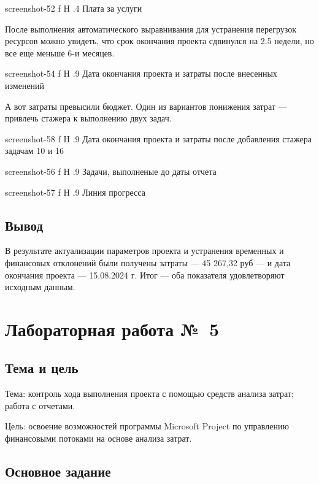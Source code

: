 \documentclass{bmstu}
\begin{document}
    {screenshot-52}
    {f}
    {H}
    {.4\textwidth}
    {Плата за услуги}
    
После выполнения автоматического выравнивания для устранения перегрузок ресурсов можно увидеть, что срок окончания проекта сдвинулся на 2.5 недели, но все еще меньше 6-и месяцев. 
    
    {screenshot-54}
    {f}
    {H}
    {.9\textwidth}
    {Дата окончания проекта и затраты после внесенных изменений}
    
А вот затраты превысили бюджет. 
Один из вариантов понижения затрат --- привлечь стажера к выполнению двух задач.

    {screenshot-58}
    {f}
    {H}
    {.9\textwidth}
    {Дата окончания проекта и затраты после добавления стажера задачам 10 и 16}
    
    {screenshot-56}
    {f}
    {H}
    {.9\textwidth}
    {Задачи, выполненые до даты отчета}
    
    {screenshot-57}
    {f}
    {H}
    {.9\textwidth}
    {Линия прогресса}
    
\section{Вывод}

В результате актуализации параметров проекта и устранения временных и финансовых отклонений были получены затраты --- 45 267,32 руб --- и дата окончания проекта --- 15.08.2024 г. 
Итог --- оба показателя удовлетворяют исходным данным.

\chapter{Лабораторная работа №~5}

\section{Тема и цель}

Тема: контроль хода выполнения проекта с помощью средств анализа затрат; работа с отчетами.

Цель: освоение возможностей программы Microsoft Project по управлению финансовыми потоками на основе анализа затрат.

\section{Основное задание}
\end{document}
